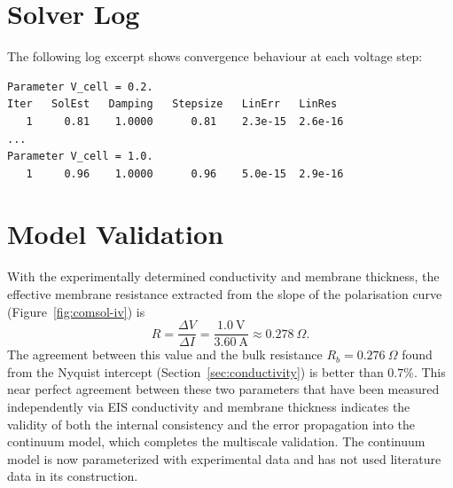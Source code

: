 \documentclass[12pt,a4paper]{report}
\begin{document}
\section{Solver Log}
\label{app:solver-log}

The following log excerpt shows convergence behaviour at each voltage step:
\begin{verbatim}
Parameter V_cell = 0.2.
Iter   SolEst   Damping   Stepsize   LinErr   LinRes
   1     0.81    1.0000      0.81    2.3e-15  2.6e-16
...
Parameter V_cell = 1.0.
   1     0.96    1.0000      0.96    5.0e-15  2.9e-16
\end{verbatim}

\section{Model Validation}

With the experimentally determined conductivity and membrane 
thickness, the effective membrane resistance extracted from 
the slope of the polarisation curve (Figure~\ref{fig:comsol-iv}) 
is 
\[
R = \frac{\Delta V}{\Delta I} = \frac{1.0\ \text{V}}{3.60\ \text{A}} 
\approx 0.278\ \Omega .
\]
The agreement between this value and the bulk resistance 
\(R_b = 0.276\ \Omega\) found from the Nyquist intercept 
(Section~\ref{sec:conductivity}) is better than \(0.7\%\). 
This near perfect agreement between these two parameters that 
have been measured independently via EIS conductivity and 
membrane thickness indicates the validity of both the internal 
consistency and the error propagation into the continuum model, 
which completes the multiscale validation. The continuum model 
is now parameterized with experimental data and has not used 
literature data in its construction.
\end{document}
